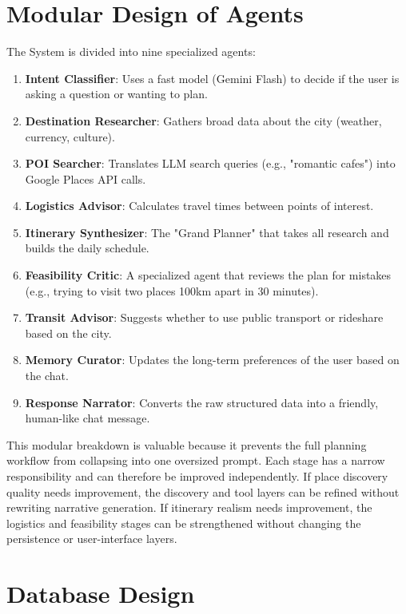 \documentclass[12pt,a4paper]{report}
\begin{document}
\section{Modular Design of Agents}

The System is divided into nine specialized agents:

\begin{enumerate}
    \item \textbf{Intent Classifier}: Uses a fast model (Gemini Flash) to decide if the user is asking a question or wanting to plan.
    \item \textbf{Destination Researcher}: Gathers broad data about the city (weather, currency, culture).
    \item \textbf{POI Searcher}: Translates LLM search queries (e.g., "romantic cafes") into Google Places API calls.
    \item \textbf{Logistics Advisor}: Calculates travel times between points of interest.
    \item \textbf{Itinerary Synthesizer}: The "Grand Planner" that takes all research and builds the daily schedule.
    \item \textbf{Feasibility Critic}: A specialized agent that reviews the plan for mistakes (e.g., trying to visit two places 100km apart in 30 minutes).
    \item \textbf{Transit Advisor}: Suggests whether to use public transport or rideshare based on the city.
    \item \textbf{Memory Curator}: Updates the long-term preferences of the user based on the chat.
    \item \textbf{Response Narrator}: Converts the raw structured data into a friendly, human-like chat message.
\end{enumerate}

This modular breakdown is valuable because it prevents the full planning workflow from collapsing into one oversized prompt. Each stage has a narrow responsibility and can therefore be improved independently. If place discovery quality needs improvement, the discovery and tool layers can be refined without rewriting narrative generation. If itinerary realism needs improvement, the logistics and feasibility stages can be strengthened without changing the persistence or user-interface layers.

\section{Database Design}
\end{document}
